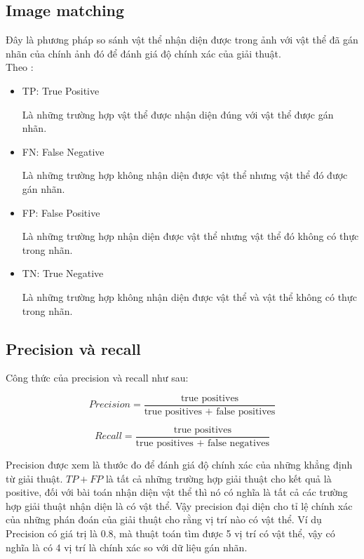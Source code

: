 \subsection{Image matching}
Đây là phương pháp so sánh vật thể nhận diện được trong ảnh với vật thể đã gán nhãn của chính ảnh đó để đánh giá độ chính xác của giải thuật.\\
Theo \cite{szeliski2010computer}:
\begin{itemize}
	\item TP: True Positive
	
	Là những trường hợp vật thể được nhận diện đúng với vật thể được gán nhãn.
	\item FN: False Negative
	
	Là những trường hợp không nhận diện được vật thể nhưng vật thể đó được gán nhãn.	
	\item FP: False Positive
	
	Là những trường hợp nhận diện được vật thể nhưng vật thể đó không có thực trong nhãn.
	\item TN: True Negative
	
	Là những trường hợp không nhận diện được vật thể và vật thể không có thực trong nhãn.
\end{itemize}
\subsection{Precision và recall}
Công thức của precision và recall như sau:
\begin{center}
	\begin{equation}
		Precision = \frac{\text{true positives}}{\text{true positives } + \text{ false positives}}
	\end{equation}
\end{center}
\begin{center}
	\begin{equation}
		Recall = \frac{\text{true positives}}{\text{true positives } + \text{ false negatives}}
	\end{equation}
\end{center}
Precision được xem là thước đo để đánh giá độ chính xác của những khẳng định từ giải thuật. $TP + FP$ là tất cả những trường hợp giải thuật cho kết quả là positive, đối với bài toán nhận diện vật thể thì nó có nghĩa là tất cả các trường hợp giải thuật nhận diện là có vật thể. Vậy precision đại diện cho tỉ lệ chính xác của những phán đoán của giải thuật cho rằng vị trí nào có vật thể. Ví dụ Precision có giá trị là 0.8, mà thuật toán tìm được 5 vị trí có vật thể, vậy có nghĩa là có 4 vị trí là chính xác so với dữ liệu gán nhãn.

